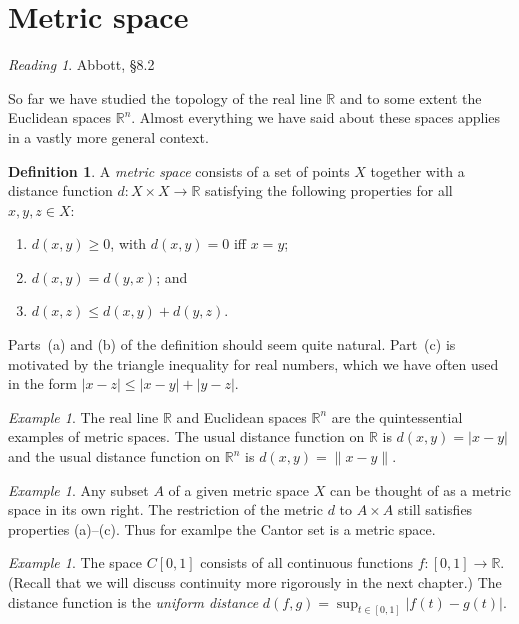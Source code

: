 \documentclass[11pt,oneside]{amsbook}
\newcommand{\R}{\mathbb R}
\theoremstyle{definition}
\theoremstyle{plain}
\theoremstyle{definition}
\newtheorem{definition}[theorem]{Definition}
\theoremstyle{remark}
\newtheorem{example}[theorem]{Example}
\newtheorem*{reading}{Reading}
\numberwithin{equation}{section}
\numberwithin{figure}{section}
\begin{document}
\newpage
\section{Metric space}

\begin{reading}
  Abbott, \S 8.2
\end{reading}

So far we have studied the topology of the real line $\R$ and to some extent the Euclidean spaces $\R^n$. Almost everything we have said about these spaces applies in a vastly more general context.

\begin{definition}
  A \emph{metric space} consists of a set of points $X$ together with a distance function $d\colon X\times X\to\R$ satisfying the following properties for all $x,y,z\in X$:
  \begin{enumerate}
  \item $d(x,y)\geq0$, with $d(x,y)=0$ iff $x=y$;
  \item $d(x,y)=d(y,x)$; and
  \item $d(x,z)\leq d(x,y)+d(y,z)$.
  \end{enumerate}
\end{definition}

Parts~(a) and (b) of the definition should seem quite natural. Part~(c) is motivated by the triangle inequality for real numbers, which we have often used in the form $|x-z|\leq|x-y|+|y-z|$.

\begin{example}
  The real line $\R$ and Euclidean spaces $\R^n$ are the quintessential examples of metric spaces. The usual distance function on $\R$ is $d(x,y)=|x-y|$ and the usual distance function on $\R^n$ is $d(x,y)=\|x-y\|$.
\end{example}

\begin{example}
  Any subset $A$ of a given metric space $X$ can be thought of as a metric space in its own right. The restriction of the metric $d$ to $A\times A$ still satisfies properties (a)--(c). Thus for examlpe the Cantor set is a metric space.
\end{example}

\begin{example}
  The space $C[0,1]$ consists of all continuous functions $f\colon[0,1]\to\R$. (Recall that we will discuss continuity more rigorously in the next chapter.) The distance function is the \emph{uniform distance} $d(f,g)=\sup_{t\in[0,1]}|f(t)-g(t)|$.
\end{example}
\end{document}
